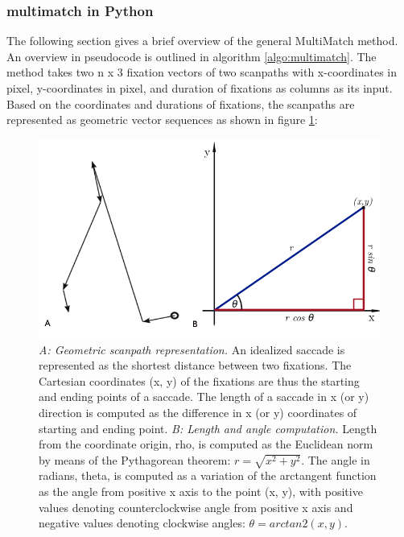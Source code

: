 \documentclass[a4paper, 12pt]{scrreprt}
\begin{document}
\subsubsection{multimatch in Python}
The following section gives a brief overview of the general MultiMatch method. An overview in pseudocode is outlined in algorithm \ref{algo:multimatch}. \newline 
The method takes two n x 3 fixation vectors of two scanpaths with x-coordinates in pixel, y-coordinates in pixel, and duration of fixations as columns as its input. Based on the coordinates and durations of fixations, the scanpaths are represented as geometric vector sequences as shown in figure \ref{fig:Polar_to_cartesian}:

\begin{figure}[H]
	\includegraphics[scale=0.35]{img/scanpathconversion.png}
	\caption[Geometric representation of eye movements]
	{\small{\textit{A: Geometric scanpath representation.} An idealized saccade is represented as the shortest distance between two fixations. The Cartesian coordinates (x, y) of the fixations are thus the starting and ending points of a saccade. The length of a saccade in x (or y) direction is computed as the difference in x (or y) coordinates of starting and ending point. \newline
			\textit{B: Length and angle computation.} Length from the coordinate origin, rho, is computed as the Euclidean norm by means of the Pythagorean theorem: $r = \sqrt{ x^2 + y^2}$. The angle in radians, theta, is computed as a variation of the arctangent function as the angle from positive x axis to the point (x, y), with positive values denoting counterclockwise angle from positive x axis and negative values denoting clockwise angles: $\theta = arctan2(x, y)$.}}
	\label{fig:Polar_to_cartesian}
\end{figure}
\end{document}
